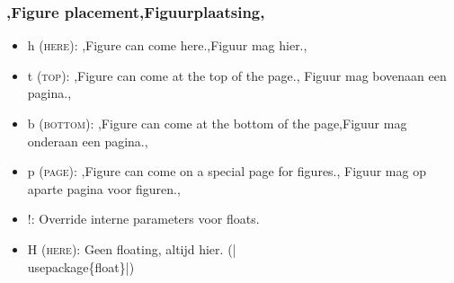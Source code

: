 
\begin{frame}
	\frametitle{\lang,Figure placement,Figuurplaatsing,}

	
	\begin{itemize}
		\item h \textsc{(here)}: \lang,Figure can come here.,Figuur mag hier.,
		\item t \textsc{(top)}: \lang,Figure can come at the top of the page.,%
			Figuur mag bovenaan een pagina.,
		\item b \textsc{(bottom)}: \lang,Figure can come at the bottom of the
			page,Figuur mag onderaan een pagina.,
		\item p \textsc{(page)}: \lang,Figure can come on a special page for figures.,%
			Figuur mag op aparte pagina voor figuren.,
		\item !: Override interne parameters voor floats.
		\item H \textsc{(here)}: 
		{Geen floating, altijd hier.} (\hll|\\usepackage\{float\}|)
	\end{itemize}

	\medskip

\end{frame}
